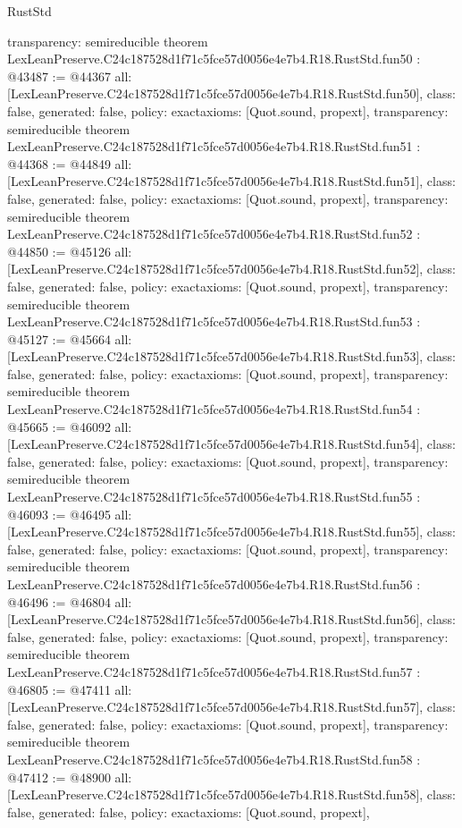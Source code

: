 \begin{lexlean}{RustStd}
\begin{coremodule}
{  transparency: semireducible
}
theorem LexLeanPreserve.C24c187528d1f71c5fce57d0056e4e7b4.R18.RustStd.fun50 : @43487 := @44367 {
  all: [LexLeanPreserve.C24c187528d1f71c5fce57d0056e4e7b4.R18.RustStd.fun50],
  class: false,
  generated: false,
  policy: exact{axioms: [Quot.sound, propext]},
  transparency: semireducible
}
theorem LexLeanPreserve.C24c187528d1f71c5fce57d0056e4e7b4.R18.RustStd.fun51 : @44368 := @44849 {
  all: [LexLeanPreserve.C24c187528d1f71c5fce57d0056e4e7b4.R18.RustStd.fun51],
  class: false,
  generated: false,
  policy: exact{axioms: [Quot.sound, propext]},
  transparency: semireducible
}
theorem LexLeanPreserve.C24c187528d1f71c5fce57d0056e4e7b4.R18.RustStd.fun52 : @44850 := @45126 {
  all: [LexLeanPreserve.C24c187528d1f71c5fce57d0056e4e7b4.R18.RustStd.fun52],
  class: false,
  generated: false,
  policy: exact{axioms: [Quot.sound, propext]},
  transparency: semireducible
}
theorem LexLeanPreserve.C24c187528d1f71c5fce57d0056e4e7b4.R18.RustStd.fun53 : @45127 := @45664 {
  all: [LexLeanPreserve.C24c187528d1f71c5fce57d0056e4e7b4.R18.RustStd.fun53],
  class: false,
  generated: false,
  policy: exact{axioms: [Quot.sound, propext]},
  transparency: semireducible
}
theorem LexLeanPreserve.C24c187528d1f71c5fce57d0056e4e7b4.R18.RustStd.fun54 : @45665 := @46092 {
  all: [LexLeanPreserve.C24c187528d1f71c5fce57d0056e4e7b4.R18.RustStd.fun54],
  class: false,
  generated: false,
  policy: exact{axioms: [Quot.sound, propext]},
  transparency: semireducible
}
theorem LexLeanPreserve.C24c187528d1f71c5fce57d0056e4e7b4.R18.RustStd.fun55 : @46093 := @46495 {
  all: [LexLeanPreserve.C24c187528d1f71c5fce57d0056e4e7b4.R18.RustStd.fun55],
  class: false,
  generated: false,
  policy: exact{axioms: [Quot.sound, propext]},
  transparency: semireducible
}
theorem LexLeanPreserve.C24c187528d1f71c5fce57d0056e4e7b4.R18.RustStd.fun56 : @46496 := @46804 {
  all: [LexLeanPreserve.C24c187528d1f71c5fce57d0056e4e7b4.R18.RustStd.fun56],
  class: false,
  generated: false,
  policy: exact{axioms: [Quot.sound, propext]},
  transparency: semireducible
}
theorem LexLeanPreserve.C24c187528d1f71c5fce57d0056e4e7b4.R18.RustStd.fun57 : @46805 := @47411 {
  all: [LexLeanPreserve.C24c187528d1f71c5fce57d0056e4e7b4.R18.RustStd.fun57],
  class: false,
  generated: false,
  policy: exact{axioms: [Quot.sound, propext]},
  transparency: semireducible
}
theorem LexLeanPreserve.C24c187528d1f71c5fce57d0056e4e7b4.R18.RustStd.fun58 : @47412 := @48900 {
  all: [LexLeanPreserve.C24c187528d1f71c5fce57d0056e4e7b4.R18.RustStd.fun58],
  class: false,
  generated: false,
  policy: exact{axioms: [Quot.sound, propext]},
}
\end{coremodule}
\end{lexlean}
